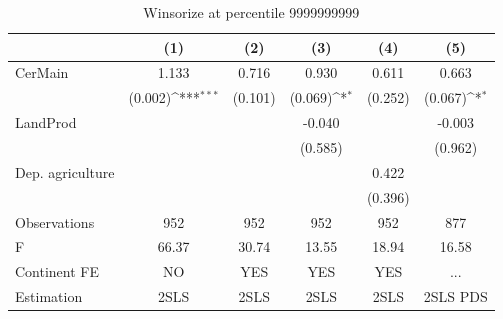 \begin{table}[htbp]\centering
\def\sym#1{\ifmmode^{#1}\else\(^{#1}\)\fi}
\caption{Winsorize at percentile 9999999999}
\begin{tabular}{l*{5}{c}}
\hline\hline
                &\multicolumn{1}{c}{(1)}         &\multicolumn{1}{c}{(2)}         &\multicolumn{1}{c}{(3)}         &\multicolumn{1}{c}{(4)}         &\multicolumn{1}{c}{(5)}         \\
\hline
CerMain         &    1.133         &    0.716         &    0.930         &    0.611         &    0.663         \\
                &  (0.002)\sym{***}&  (0.101)         &  (0.069)\sym{*}  &  (0.252)         &  (0.067)\sym{*}  \\
LandProd        &                  &                  &   -0.040         &                  &   -0.003         \\
                &                  &                  &  (0.585)         &                  &  (0.962)         \\
Dep. agriculture&                  &                  &                  &    0.422         &                  \\
                &                  &                  &                  &  (0.396)         &                  \\
\hline
Observations    &      952         &      952         &      952         &      952         &      877         \\
F               &    66.37         &    30.74         &    13.55         &    18.94         &    16.58         \\
Continent FE    &       NO         &      YES         &      YES         &      YES         &      ...         \\
Estimation      &     2SLS         &     2SLS         &     2SLS         &     2SLS         & 2SLS PDS         \\
\hline\hline
\end{tabular}
\end{table}
